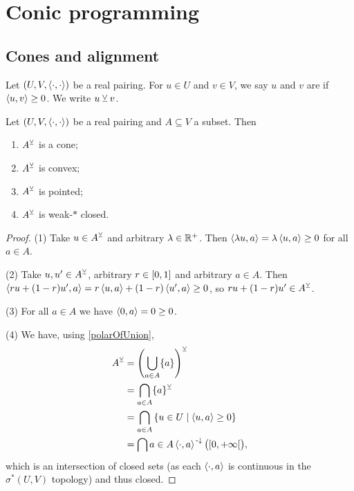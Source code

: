 \section{Conic programming}
\subsection{Cones and alignment}
\begin{definition}
Let $\sSet{U,V,\pair{\cdot,\cdot}}$ be a real pairing. For $u\in U$ and $v\in V$, we say $u$ and $v$ are  if $\left\langle u,v \right\rangle\geq 0$. We write $u \veebar v$.
\end{definition}

\begin{lemma} \label{dualConeProperties}
Let $\sSet{U,V,\pair{\cdot,\cdot}}$ be a real pairing and $A\subseteq V$ a subset. Then
\begin{enumerate}
\item $A^\veebar$ is a cone;
\item $A^\veebar$ is convex;
\item $A^\veebar$ is pointed;
\item $A^\veebar$ is weak-$*$ closed.
\end{enumerate}
\end{lemma}
\begin{proof}
(1) Take $u\in A^\veebar$ and arbitrary $\lambda\in\mathbb{R}^+$. Then $\left\langle \lambda u, a \right\rangle = \lambda \left\langle u, a \right\rangle \geq 0$ for all $a\in A$.

(2) Take $u,u'\in A^\veebar$, arbitrary $r\in \interval{0,1}$ and arbitrary $a\in A$. Then $\left\langle ru+ (1-r)u', a \right\rangle = r\left\langle u, a \right\rangle+ (1-r)\left\langle u', a \right\rangle \geq 0$, so $ru+(1-r)u'\in A^\veebar$.

(3) For all $a\in A$ we have $\left\langle 0, a \right\rangle = 0 \geq 0$.

(4) We have, using \ref{polarOfUnion},
\begin{align*}
A^\pairingAligned &= \left(\bigcup_{a\in A}\{a\}\right)^\pairingAligned \\
&= \bigcap_{a\in A} \{a\}^\pairingAligned \\
&= \bigcap_{a\in A}\setbuilder{u\in U}{\pair{u,a}\geq 0} \\
&= \bigcap{a\in A}\pair{\cdot, a}^{\preimf}\big(\interval[co]{0,+\infty}\big),
\end{align*}
which is an intersection of closed sets (as each $\left\langle \cdot, a \right\rangle$ is continuous in the $\sigma^*(U,V)$ topology) and thus closed.
\end{proof}

